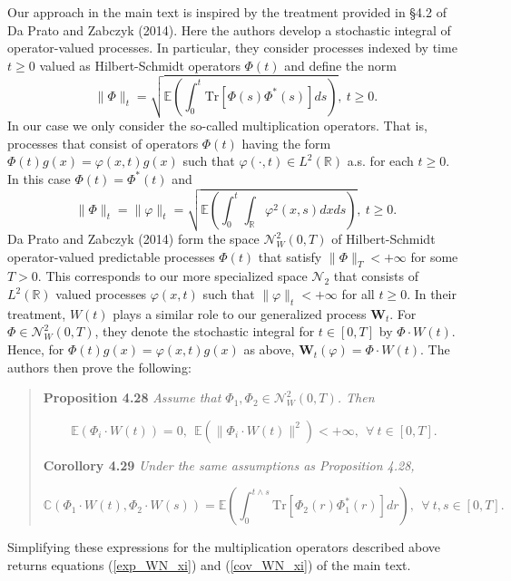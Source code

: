 \documentclass[]{article}
\begin{document}
Our approach in the main text is inspired by the treatment provided in
\S4.2 of Da Prato and Zabczyk (2014). Here the authors develop a
stochastic integral of operator-valued processes. In particular, they
consider processes indexed by time \(t\geq0\) valued as Hilbert-Schmidt
operators \(\Phi(t)\) and define the norm \begin{equation}
\|\Phi\|_t=\sqrt{\mathbb{E}\left(\int_0^t\mathrm{Tr}[\Phi(s)\Phi^*(s)]ds\right)}, \ t\geq0.
\end{equation} In our case we only consider the so-called multiplication
operators. That is, processes that consist of operators \(\Phi(t)\)
having the form \(\Phi(t)g(x)=\varphi(x,t)g(x)\) such that
\(\varphi(\cdot,t)\in L^2(\mathbb{R})\) a.s. for each \(t\geq0\). In
this case \(\Phi(t)=\Phi^*(t)\) and \begin{equation}
\|\Phi\|_t=\|\varphi\|_t=\sqrt{\mathbb{E}\left(\int_0^t\int_\mathbb{R}\varphi^2(x,s)dxds\right)}, \ t\geq0.
\end{equation} Da Prato and Zabczyk (2014) form the space
\(\mathscr{N}^2_W(0,T)\) of Hilbert-Schmidt operator-valued predictable
processes \(\Phi(t)\) that satisfy \(\|\Phi\|_T<+\infty\) for some
\(T>0\). This corresponds to our more specialized space
\(\mathscr{N}_2\) that consists of \(L^2(\mathbb{R})\) valued processes
\(\varphi(x,t)\) such that \(\|\varphi\|_t<+\infty\) for all \(t\geq0\).
In their treatment, \(W(t)\) plays a similar role to our generalized
process \(\mathbf{W}_t\). For \(\Phi\in\mathscr{N}^2_W(0,T)\), they
denote the stochastic integral for \(t\in[0,T]\) by \(\Phi\cdot W(t)\).
Hence, for \(\Phi(t) g(x)=\varphi(x,t)g(x)\) as above,
\(\mathbf{W}_t(\varphi)=\Phi\cdot W(t)\). The authors then prove the
following:

\begin{quote}
\textbf{Proposition 4.28} \emph{Assume that
\(\Phi_1,\Phi_2\in\mathscr{N}^2_W(0,T)\). Then}

\[\mathbb{E}(\Phi_i\cdot W(t))=0, \ \ \mathbb{E}(\|\Phi_i\cdot W(t)\|^2)<+\infty, \ \ \forall \ t\in[0,T].\]

\textbf{Corollory 4.29} \emph{Under the same assumptions as Proposition
4.28,}

\[\mathbb{C}(\Phi_1\cdot W(t),\Phi_2\cdot W(s))=\mathbb{E}\left(\int_0^{t\wedge s}\mathrm{Tr}[\Phi_2(r)\Phi_1^*(r)]dr\right), \ \ \forall \ t,s\in[0,T].\]
\end{quote}

Simplifying these expressions for the multiplication operators described
above returns equations (\ref{exp_WN_xi}) and (\ref{cov_WN_xi}) of the
main text.
\end{document}
